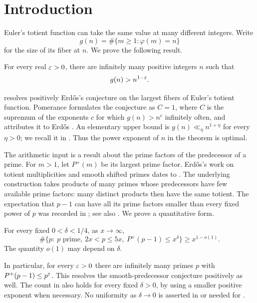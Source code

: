 \section{Introduction}\label{sec:introduction}

Euler's totient function can take the same value at many different
integers. Write
\[
 g(n)=\#\{m\ge1:\varphi(m)=n\}
\]
for the size of its fiber at $n$. We prove the following result.

\begin{theorem}\label{thm:totient}
For every real $\varepsilon>0$, there are infinitely many positive integers
$n$ such that
\[
 g(n)>n^{1-\varepsilon}.
\]
\end{theorem}

 resolves positively Erd\H{o}s's conjecture on the
largest fibers of Euler's totient function. Pomerance
\cite[p.~84]{Pomerance1980} formulates the conjecture as $C=1$, where
$C$ is the supremum of the exponents $c$ for which $g(n)>n^c$ infinitely
often, and attributes it to Erd\H{o}s \cite{Erdos1956}. An elementary
upper bound is $g(n)\ll_\eta n^{1+\eta}$ for every $\eta>0$; we recall
it in . Thus the power exponent of $n$ in the theorem is
optimal.

The arithmetic input is a result about the prime factors of the
predecessor of a prime. For $m>1$, let $P^+(m)$ be its largest prime
factor. Erd\H{o}s's work on totient multiplicities and smooth shifted
primes dates to \cite[Section~3]{Erdos1935}. The underlying
construction takes products of many primes whose predecessors have
few available prime factors: many distinct products then have the same
totient. The expectation that $p-1$ can have
all its prime factors smaller than every fixed power of $p$ was
recorded in \cite{Erdos1956}; see also
\cite[Introduction]{Lichtman2022}. We prove a quantitative form.

\begin{theorem}\label{thm:smooth}
For every fixed $0<\delta<1/4$, as $x\to\infty$,
\begin{equation}\label{eq:main-smooth}
 \#\{p:\ p\text{ prime},\ 2x<p\le5x,
                   \ P^+(p-1)\le x^\delta\}
 \ge x^{1-o(1)}.
\end{equation}
The quantity $o(1)$ may depend on $\delta$.
\end{theorem}

In particular, for every $\varepsilon>0$ there are infinitely many primes
$p$ with $P^+(p-1)\le p^\varepsilon$. This resolves the smooth-predecessor
conjecture positively as well. The count in 
also holds for every fixed $\delta>0$, by using a smaller positive
exponent when necessary. No uniformity as $\delta\to0$ is
asserted in  or needed for .

